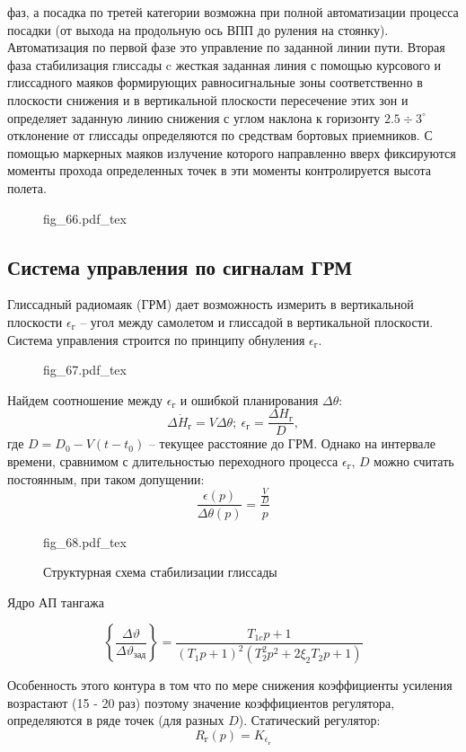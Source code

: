 \documentclass{article}
\newcommand{\incfig}[1]{
    {#1.pdf_tex}
}
\begin{document}
фаз, а посадка по третей категории возможна при полной автоматизации процесса
посадки (от выхода на продольную ось ВПП до руления на стоянку).
Автоматизация по первой фазе это управление по заданной линии пути. Вторая фаза
стабилизация глиссады c жесткая заданная линия с помощью курсового и
глиссадного маяков формирующих равносигнальные зоны соответственно в плоскости
снижения и в вертикальной плоскости пересечение этих зон и определяет заданную
линию снижения с углом наклона к горизонту $2.5 \div 3^\circ$ отклонение от
глиссады определяются по средствам бортовых приемников.
С помощью маркерных маяков излучение которого направленно вверх фиксируются
моменты прохода определенных точек в эти моменты контролируется высота полета.
\begin{figure}[H]
    \centering
    \incfig{fig_66}
    \label{fig:fig_66}
\end{figure}

\subsection{Система управления по сигналам ГРМ}
Глиссадный радиомаяк (ГРМ) дает возможность измерить в вертикальной плоскости
$\epsilon_\text{г}$  -- угол между самолетом и глиссадой в вертикальной
плоскости. Система управления строится по принципу обнуления
$\epsilon_\text{г}$.
\begin{figure}[H]
    \centering
    \incfig{fig_67}
    \label{fig:fig_67}
\end{figure}

Найдем соотношение между $\epsilon_\text{г}$ и ошибкой планирования $\Delta
\theta$:
\[
    \Delta \dot{H}_{\text{г}} = V \Delta \theta; \ \epsilon_\text{г} =
    \frac{\Delta H_\text{г}}{D},
\]
где $D = D_0 - V(t-t_0)$ -- текущее расстояние до ГРМ.
Однако на интервале времени, сравнимом с длительностью переходного процесса
$\epsilon_\text{г}$, $D$ можно считать постоянным, при таком допущении:
\[
    \frac{\epsilon(p)}{\Delta \theta(p)} = \frac{\frac{V}{D}}{p}
\]

\begin{figure}[H]
    \centering
    \incfig{fig_68}
    \caption{Структурная схема стабилизации глиссады}
    \label{fig:fig_68}
\end{figure}
Ядро АП тангажа

\[
    \left\{ \frac{\Delta \vartheta}{\Delta \vartheta_\text{зад}} \right\}  =
    \frac{T_{1c}p + 1}{(T_{1}p + 1)^2 ( T_2^2p^2 + 2 \xi_2 T_2 p + 1 )}
\]


Особенность этого контура в том что по мере снижения коэффициенты усиления
возрастают (15 - 20 раз) поэтому значение коэффициентов регулятора,
определяются в ряде точек (для разных $D$).
Статический регулятор:
\[
    R_\text{г}(p) = K_{\epsilon_\text{г}}
\]
\end{document}
